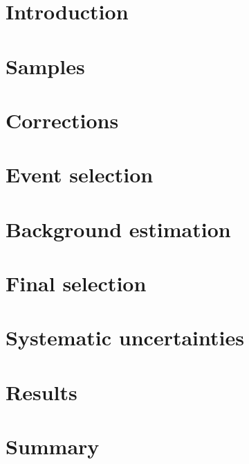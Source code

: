 \section{Introduction} \label{sec:Introduction}


\section{Samples} \label{sec:Samples}


\section{Corrections} \label{sec:Corrections}


\section{Event selection} \label{sec:EventSelection}


\section{Background estimation} \label{sec:Backgrounds}


\section{Final selection} \label{sec:FinalSelection}


\section{Systematic uncertainties} \label{sec:Systematics}


\section{Results} \label{sec:Results}


\section{Summary} \label{sec:Summary}
